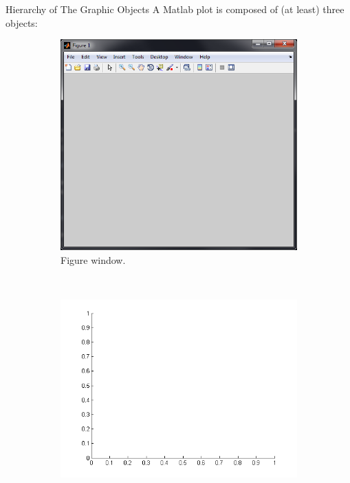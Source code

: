 \documentclass{beamer}  %
\begin{document}
\begin{frame}{Hierarchy of The Graphic Objects}
A Matlab plot is composed of (at least) three objects:
\setcounter{subfigure}{0}
\begin{figure}
        \begin{subfigure}[b]{0.3\textwidth}
                \centering
                \includegraphics[width=\textwidth]{figure_window.png}
                \caption{Figure window.}
        \end{subfigure}%
        ~\pause
        \begin{subfigure}[b]{0.3\textwidth}
                \centering
                \includegraphics[width=\textwidth]{empty_axis.png}

\end{subfigure}
\end{figure}
\end{frame}
\end{document}
